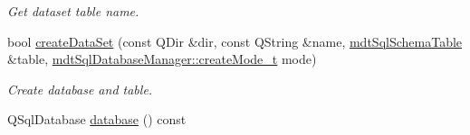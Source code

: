 \begin{DoxyCompactItemize}
\begin{DoxyCompactList}\small\item\em Get dataset table name. \end{DoxyCompactList}\item 
bool \hyperlink{classmdt_data_table_manager_ae813c6c4323a1949d489a24c07e914fa}{createDataSet} (const QDir \&dir, const QString \&name, \hyperlink{classmdt_sql_schema_table}{mdtSqlSchemaTable} \&table, \hyperlink{classmdt_sql_database_manager_a2f5b46d67a88095053a5edfc415c7418}{mdtSqlDatabaseManager::createMode\_\-t} mode)
\begin{DoxyCompactList}\small\item\em Create database and table. \end{DoxyCompactList}\item 
\hypertarget{classmdt_data_table_manager_a9026c9d3d102246af243b68c815fba04}{
QSqlDatabase \hyperlink{classmdt_data_table_manager_a9026c9d3d102246af243b68c815fba04}{database} () const }
\label{classmdt_data_table_manager_a9026c9d3d102246af243b68c815fba04}


\end{DoxyCompactItemize}
